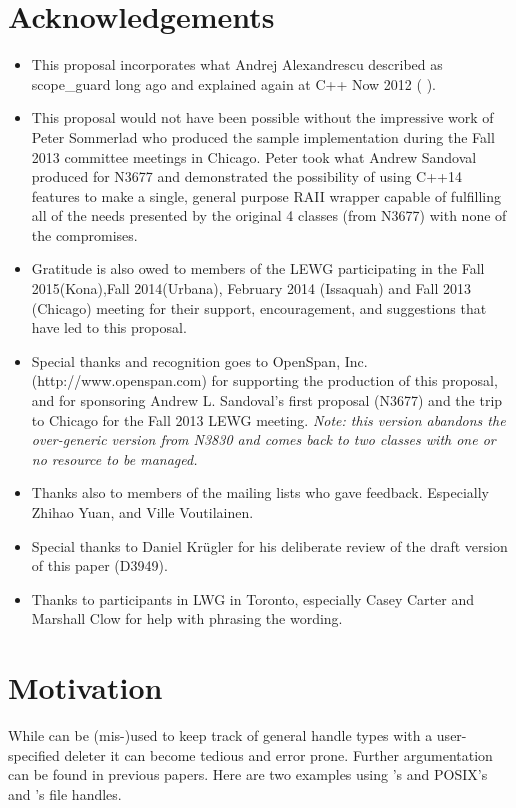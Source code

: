 \documentclass[ebook,11pt,article]{memoir}
\begin{document}
\chapter{Acknowledgements}
\begin{itemize}
\item This proposal incorporates what Andrej Alexandrescu described as scope_guard long ago and explained again at C++ Now 2012 (%
).
\item This proposal would not have been possible without the impressive work of Peter Sommerlad who produced the sample implementation during the Fall 2013 committee meetings in Chicago.  Peter took what Andrew Sandoval produced for N3677 and demonstrated the possibility of using C++14 features to make a single, general purpose RAII wrapper capable of fulfilling all of the needs presented by the original 4 classes (from N3677) with none of the compromises.
\item Gratitude is also owed to members of the LEWG participating in the Fall 2015(Kona),Fall 2014(Urbana), February 2014 (Issaquah) and Fall 2013 (Chicago) meeting for their support, encouragement, and suggestions that have led to this proposal.
\item Special thanks and recognition goes to OpenSpan, Inc. (http://www.openspan.com) for supporting the production of this proposal, and for sponsoring Andrew L. Sandoval's first proposal (N3677) and the trip to Chicago for the Fall 2013 LEWG meeting. \emph{Note: this version abandons the over-generic version from N3830 and comes back to two classes with one or no resource to be managed.}
\item Thanks also to members of the mailing lists who gave feedback. Especially Zhihao Yuan, and Ville Voutilainen.
\item Special thanks to Daniel Kr\"ugler for his deliberate review of the draft version of this paper (D3949).
\item Thanks to participants in LWG in Toronto, especially Casey Carter and Marshall Clow for help with phrasing the wording.
\end{itemize}
\newpage
\chapter{Motivation}
While  can be (mis-)used to keep track of general handle types with a user-specified deleter it can become tedious and error prone. Further argumentation can be found in previous papers. Here are two examples using  's  and POSIX's and 's  file handles. 
\end{document}
